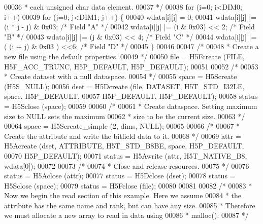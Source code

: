 \begin{DoxyCode}
00036 \textcolor{comment}{     * each unsigned char data element.}
00037 \textcolor{comment}{     */}
00038     \textcolor{keywordflow}{for} (i=0; i<DIM0; i++)
00039         \textcolor{keywordflow}{for} (j=0; j<DIM1; j++) \{
00040             wdata[i][j] = 0;
00041             wdata[i][j] |= (i * j - j) & 0x03;          \textcolor{comment}{/* Field "A" */}
00042             wdata[i][j] |= (i & 0x03) << 2;             \textcolor{comment}{/* Field "B" */}
00043             wdata[i][j] |= (j & 0x03) << 4;             \textcolor{comment}{/* Field "C" */}
00044             wdata[i][j] |= ( (i + j) & 0x03 ) <<6;      \textcolor{comment}{/* Field "D" */}
00045         \}
00046 
00047     \textcolor{comment}{/*}
00048 \textcolor{comment}{     * Create a new file using the default properties.}
00049 \textcolor{comment}{     */}
00050     file = H5Fcreate (FILE, H5F\_ACC\_TRUNC, H5P\_DEFAULT, H5P\_DEFAULT);
00051 
00052     \textcolor{comment}{/*}
00053 \textcolor{comment}{     * Create dataset with a null dataspace.}
00054 \textcolor{comment}{     */}
00055     space = H5Screate (H5S\_NULL);
00056     dset = H5Dcreate (file, DATASET, H5T\_STD\_I32LE, space, H5P\_DEFAULT,
00057                 H5P\_DEFAULT, H5P\_DEFAULT);
00058     status = H5Sclose (space);
00059 
00060     \textcolor{comment}{/*}
00061 \textcolor{comment}{     * Create dataspace.  Setting maximum size to NULL sets the maximum}
00062 \textcolor{comment}{     * size to be the current size.}
00063 \textcolor{comment}{     */}
00064     space = H5Screate\_simple (2, dims, NULL);
00065 
00066     \textcolor{comment}{/*}
00067 \textcolor{comment}{     * Create the attribute and write the bitfield data to it.}
00068 \textcolor{comment}{     */}
00069     attr = H5Acreate (dset, ATTRIBUTE, H5T\_STD\_B8BE, space, H5P\_DEFAULT,
00070                 H5P\_DEFAULT);
00071     status = H5Awrite (attr, H5T\_NATIVE\_B8, wdata[0]);
00072 
00073     \textcolor{comment}{/*}
00074 \textcolor{comment}{     * Close and release resources.}
00075 \textcolor{comment}{     */}
00076     status = H5Aclose (attr);
00077     status = H5Dclose (dset);
00078     status = H5Sclose (space);
00079     status = H5Fclose (file);
00080 
00081 
00082     \textcolor{comment}{/*}
00083 \textcolor{comment}{     * Now we begin the read section of this example.  Here we assume}
00084 \textcolor{comment}{     * the attribute has the same name and rank, but can have any size.}
00085 \textcolor{comment}{     * Therefore we must allocate a new array to read in data using}
00086 \textcolor{comment}{     * malloc().}
00087 \textcolor{comment}{     */}

\end{DoxyCode}
